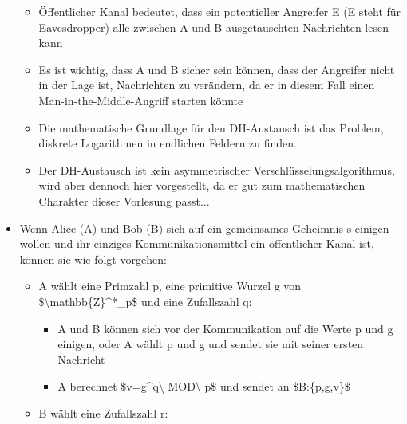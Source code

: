 \documentclass[a4paper]{article}
\begin{document}
\begin{multicols}{3}
\begin{itemize}
              \begin{itemize}
                  \item
                        Öffentlicher Kanal bedeutet, dass ein potentieller Angreifer E (E
                        steht für Eavesdropper) alle zwischen A und B ausgetauschten
                        Nachrichten lesen kann
                  \item
                        Es ist wichtig, dass A und B sicher sein können, dass der Angreifer
                        nicht in der Lage ist, Nachrichten zu verändern, da er in diesem
                        Fall einen Man-in-the-Middle-Angriff starten könnte
                  \item
                        Die mathematische Grundlage für den DH-Austausch ist das Problem,
                        diskrete Logarithmen in endlichen Feldern zu finden.
                  \item
                        Der DH-Austausch ist kein asymmetrischer
                        Verschlüsselungsalgorithmus, wird aber dennoch hier vorgestellt, da
                        er gut zum mathematischen Charakter dieser Vorlesung passt...
              \end{itemize}
        \item
              Wenn Alice (A) und Bob (B) sich auf ein gemeinsames Geheimnis s
              einigen wollen und ihr einziges Kommunikationsmittel ein öffentlicher
              Kanal ist, können sie wie folgt vorgehen:

              \begin{itemize}
                  \item
                        A wählt eine Primzahl p, eine primitive Wurzel g von
                        \$\textbackslash mathbb\{Z\}\^{}*\_p\$ und eine Zufallszahl q:

                        \begin{itemize}
                            \item
                                  A und B können sich vor der Kommunikation auf die Werte p und g
                                  einigen, oder A wählt p und g und sendet sie mit seiner ersten
                                  Nachricht
                            \item
                                  A berechnet \$v=g\^{}q\textbackslash{} MOD\textbackslash{} p\$ und
                                  sendet an \$B:\{p,g,v\}\$
                        \end{itemize}
                  \item
                        B wählt eine Zufallszahl r:


\end{itemize}
\end{itemize}
\end{multicols}
\end{document}
